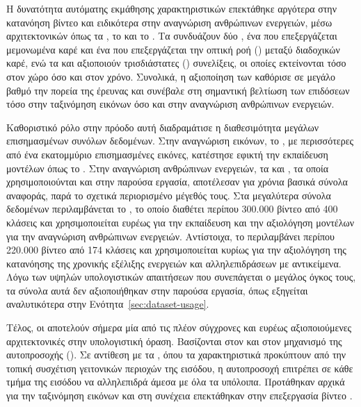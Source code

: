 Η δυνατότητα αυτόματης εκμάθησης χαρακτηριστικών επεκτάθηκε αργότερα
στην κατανόηση βίντεο και ειδικότερα στην αναγνώριση ανθρώπινων
ενεργειών, μέσω αρχιτεκτονικών όπως τα 
\cite{simonyan2014two}, το  \cite{tran2015learning} και το
 \cite{carreira2017quo}. Τα  συνδυάζουν
δύο , ένα που επεξεργάζεται μεμονωμένα καρέ και ένα που
επεξεργάζεται την οπτική ροή () μεταξύ διαδοχικών
καρέ, ενώ τα  και  αξιοποιούν τρισδιάστατες
() συνελίξεις, οι οποίες εκτείνονται τόσο στον χώρο όσο και στον
χρόνο. Συνολικά, η αξιοποίηση των  καθόρισε σε μεγάλο βαθμό
την πορεία της έρευνας και συνέβαλε στη σημαντική βελτίωση των επιδόσεων
τόσο στην ταξινόμηση εικόνων όσο και στην αναγνώριση ανθρώπινων
ενεργειών.

Καθοριστικό ρόλο στην πρόοδο αυτή διαδραμάτισε η διαθεσιμότητα μεγάλων
επισημασμένων συνόλων δεδομένων. Στην αναγνώριση εικόνων, το
 \cite{deng2009imagenet}, με περισσότερες από ένα
εκατομμύριο επισημασμένες εικόνες, κατέστησε εφικτή την εκπαίδευση
μοντέλων όπως το . Στην αναγνώριση ανθρώπινων ενεργειών, τα
 \cite{kuehne2011hmdb} και 
\cite{soomro2012ucf101}, τα οποία χρησιμοποιούνται και στην παρούσα
εργασία, αποτέλεσαν για χρόνια βασικά σύνολα
αναφοράς, παρά το σχετικά περιορισμένο μέγεθός τους. Στα μεγαλύτερα
σύνολα δεδομένων περιλαμβάνεται το 
\cite{kay2017kinetics}, το οποίο διαθέτει περίπου 300.000 βίντεο από 400
κλάσεις και χρησιμοποιείται ευρέως για την εκπαίδευση και την αξιολόγηση
μοντέλων για την αναγνώριση ανθρώπινων ενεργειών. Αντίστοιχα, το
 \cite{goyal2017something} περιλαμβάνει
περίπου 220.000 βίντεο από 174 κλάσεις και χρησιμοποιείται κυρίως για την
αξιολόγηση της κατανόησης της χρονικής εξέλιξης ενεργειών και
αλληλεπιδράσεων με αντικείμενα. Λόγω των υψηλών υπολογιστικών απαιτήσεων που συνεπάγεται ο μεγάλος όγκος
τους, τα σύνολα αυτά δεν αξιοποιήθηκαν στην παρούσα εργασία, όπως
εξηγείται αναλυτικότερα στην Ενότητα~\ref{sec:dataset-usage}.

Τέλος, οι  αποτελούν σήμερα μία από τις πλέον
σύγχρονες και ευρέως αξιοποιούμενες αρχιτεκτονικές στην υπολογιστική
όραση. Βασίζονται στον  \cite{vaswani2017attention} και
στον μηχανισμό της αυτοπροσοχής (). Σε αντίθεση με
τα , όπου τα χαρακτηριστικά προκύπτουν από την τοπική
συσχέτιση γειτονικών περιοχών της εισόδου, η αυτοπροσοχή επιτρέπει σε
κάθε τμήμα της εισόδου να αλληλεπιδρά άμεσα με όλα τα υπόλοιπα.
Προτάθηκαν αρχικά για την ταξινόμηση εικόνων
\cite{dosovitskiy2021image} και στη συνέχεια επεκτάθηκαν στην
επεξεργασία βίντεο \cite{arnab2021vivit,bertasius2021space}.

